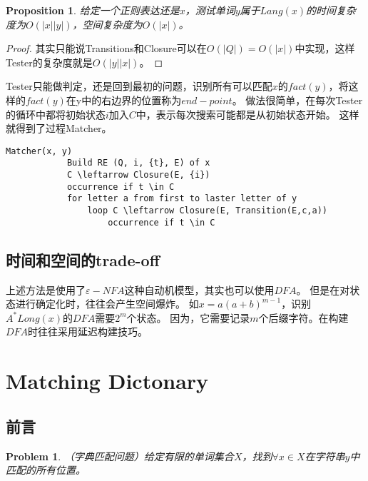 \documentclass[UTF8]{ctexart}
\newtheorem{prop}[thm]{Proposition}
\newtheorem{prob}[thm]{Problem}
\theoremstyle{definition}
\theoremstyle{remark}
\numberwithin{equation}{subsection}
\begin{document}
	\begin{prop}
		给定一个正则表达还是$x$，测试单词$y$属于$Lang(x)$的时间复杂度为$O(|x||y|)$，空间复杂度为$O(|x|)$。
	\end{prop}
	
	\begin{proof}
		其实只能说Transitions和Closure可以在$O(|Q|)=O(|x|)$中实现，这样Tester的复杂度就是$O(|y||x|)$。
	\end{proof}
	
	Tester只能做判定，还是回到最初的问题，识别所有可以匹配$x$的$fact(y)$，将这样的$fact(y)$在y中的右边界的位置称为$end-point$。
	做法很简单，在每次Tester的循环中都将初始状态$i$加入$C$中，表示每次搜索可能都是从初始状态开始。
	这样就得到了过程Matcher。
	
	\begin{lstlisting}[frame=shadowbox,framexleftmargin=5mm,rulesepcolor=\color{gray},numbers=none]
		Matcher(x, y)
			Build RE (Q, i, {t}, E) of x
			C \leftarrow Closure(E, {i})
			occurrence if t \in C
			for letter a from first to laster letter of y
				loop C \leftarrow Closure(E, Transition(E,c,a))
					occurrence if t \in C
	\end{lstlisting}
	
\subsection{时间和空间的trade-off}
	
	上述方法是使用了$\varepsilon-NFA$这种自动机模型，其实也可以使用$DFA$。
	但是在对状态进行确定化时，往往会产生空间爆炸。
	如$x = a(a+b)^{m-1}$，识别$A^*Long(x)$的$DFA$需要$2^m$个状态。
	因为，它需要记录$m$个后缀字符。在构建$DFA$时往往采用延迟构建技巧。
	

\section{Matching Dictonary}

\subsection{前言}
	
	\begin{prob}
		（字典匹配问题）给定有限的单词集合$X$，找到$\forall x \in X$在字符串$y$中匹配的所有位置。
	\end{prob}
	
\end{document}

